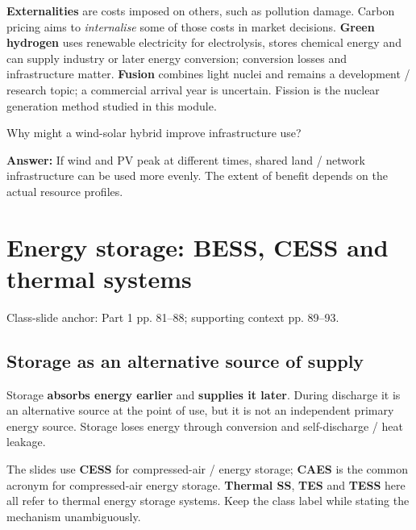 \documentclass[11pt,a4paper]{article}
\newcommand{\slides}[1]{{\small\color{muted}\textsf{Class-slide anchor: #1.}}\par}
\newcommand{\chapterstart}[2]{\clearpage\section{#1}\label{#2}}
\newcommand{\checkq}[2]{\begin{tcolorbox}[breakable=false,colback=pale,colframe=teal,coltitle=white,title={Check your understanding}]#1\par\textbf{Answer:} #2\end{tcolorbox}}
\begin{document}
\textbf{Externalities} are costs imposed on others, such as pollution damage. Carbon pricing aims to \emph{internalise} some of those costs in market decisions. \textbf{Green hydrogen} uses renewable electricity for electrolysis, stores chemical energy and can supply industry or later energy conversion; conversion losses and infrastructure matter. \textbf{Fusion} combines light nuclei and remains a development / research topic; a commercial arrival year is uncertain. Fission is the nuclear generation method studied in this module.
\checkq{Why might a wind-solar hybrid improve infrastructure use?}{If wind and PV peak at different times, shared land / network infrastructure can be used more evenly. The extent of benefit depends on the actual resource profiles.}

\chapterstart{Energy storage: BESS, CESS and thermal systems}{storage}
\slides{Part 1 pp. 81--88; supporting context pp. 89--93}
\subsection{Storage as an alternative source of supply}
Storage \textbf{absorbs energy earlier} and \textbf{supplies it later}. During discharge it is an alternative source at the point of use, but it is not an independent primary energy source. Storage loses energy through conversion and self-discharge / heat leakage.

The slides use \textbf{CESS} for compressed-air / energy storage; \textbf{CAES} is the common acronym for compressed-air energy storage. \textbf{Thermal SS}, \textbf{TES} and \textbf{TESS} here all refer to thermal energy storage systems. Keep the class label while stating the mechanism unambiguously.
\end{document}
